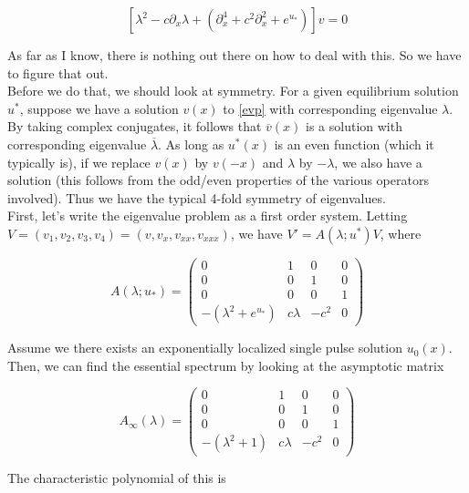 \documentclass[12pt]{article}
\begin{document}
\begin{equation}\label{evp}
[\lambda^2 - c \partial_x \lambda + (\partial_x^4 + c^2 \partial_x^2 + e^{u_*})]v = 0
\end{equation}

As far as I know, there is nothing out there on how to deal with this. So we have to figure that out.\\

Before we do that, we should look at symmetry. For a given equilibrium solution $u^*$, suppose we have a solution $v(x)$ to \eqref{evp} with corresponding eigenvalue $\lambda$. By taking complex conjugates, it follows that $\overline{v}(x)$ is a solution with corresponding eigenvalue $\overline{\lambda}$. As long as $u^*(x)$ is an even function (which it typically is), if we replace $v(x)$ by $v(-x)$ and $\lambda$ by $-\lambda$, we also have a solution (this follows from the odd/even properties of the various operators involved). Thus we have the typical 4-fold symmetry of eigenvalues.\\ 

First, let's write the eigenvalue problem as a first order system. Letting $V = (v_1, v_2, v_3, v_4) = (v, v_x, v_{xx}, v_{xxx})$, we have $V' = A(\lambda; u^*)V$, where

\begin{equation}
A(\lambda; u_*) = \begin{pmatrix}
0 & 1 & 0 & 0 \\
0 & 0 & 1 & 0 \\
0 & 0 & 0 & 1 \\
-(\lambda^2 + e^{u_*}) & c \lambda & -c^2 & 0 
\end{pmatrix}
\end{equation}

Assume we there exists an exponentially localized single pulse solution $u_0(x)$. Then, we can find the essential spectrum by looking at the asymptotic matrix

\begin{equation*}
A_\infty(\lambda) = \begin{pmatrix}
0 & 1 & 0 & 0 \\
0 & 0 & 1 & 0 \\
0 & 0 & 0 & 1 \\
-(\lambda^2 + 1) & c \lambda & -c^2 & 0 
\end{pmatrix}
\end{equation*}

The characteristic polynomial of this is 
\end{document}
